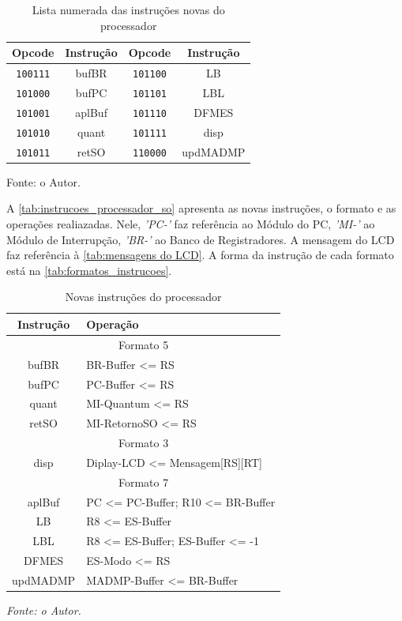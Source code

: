 \documentclass[
	12pt,				%
	oneside,
	a4paper,			%
	english,			%
	french,				%
	spanish,			%
	brazil,				%
	]{abntex2}
\begin{document}
\setlength{\tabcolsep}{10pt} %
\begin{table}[H]
\centering
\caption{Lista numerada das instruções novas do processador}
\label{tab:opcode_instrucoes_SO}
\begin{tabular}{|c c|c c|}
\hline
Opcode & Instrução & Opcode & Instrução \\
\hline
\texttt{100111} & bufBR  & \texttt{101100} & LB    \\
\texttt{101000} & bufPC  & \texttt{101101} & LBL   \\
\texttt{101001} & aplBuf & \texttt{101110} & DFMES \\
\texttt{101010} & quant  & \texttt{101111} & disp  \\
\texttt{101011} & retSO  & \texttt{110000} & updMADMP  \\
\hline
\end{tabular}
\vspace{-0.5em}
\begin{center}
Fonte: o Autor.
\end{center}
\end{table}

A \autoref{tab:instrucoes_processador_so} apresenta as novas instruções, o formato e as operações realiazadas. Nele, \textit{'PC-'} faz referência ao Módulo do PC, \textit{'MI-'} ao Módulo de Interrupção, \textit{'BR-'} ao Banco de Registradores. A mensagem do LCD faz referência à \autoref{tab:mensagens do LCD}. A forma da instrução de cada formato está na \autoref{tab:formatos_instrucoes}.

\setlength{\tabcolsep}{10pt}
\begin{table}[H]
\centering
\caption{Novas instruções do processador}
\label{tab:instrucoes_processador_so}
\begin{tabular}{|c|>{\raggedright\arraybackslash}p{7cm}|}
\hline
Instrução & Operação\\
\hline
\multicolumn{2}{|c|}{Formato 5} \\
\hline
	bufBR & BR-Buffer <= RS \\
	bufPC & PC-Buffer <= RS \\
	quant &  MI-Quantum <= RS \\
	retSO &  MI-RetornoSO <= RS \\
\hline
\multicolumn{2}{|c|}{Formato 3} \\
\hline
disp & Diplay-LCD <= Mensagem[RS][RT] \\
\hline
\multicolumn{2}{|c|}{Formato 7} \\
\hline
aplBuf & PC <= PC-Buffer; R10 <= BR-Buffer \\
LB & R8 <= ES-Buffer \\
LBL & R8 <= ES-Buffer; ES-Buffer <= -1 \\
DFMES & ES-Modo <= RS \\
updMADMP & MADMP-Buffer <= BR-Buffer \\
\hline
\end{tabular}
\vspace{-0.5em}
\begin{center}
\textit{Fonte: o Autor.}
\end{center}
\end{table}
\end{document}
